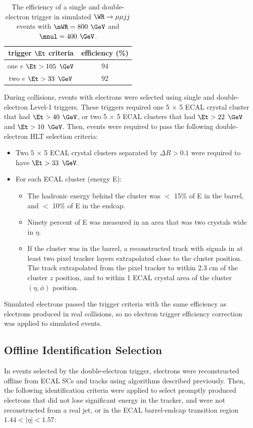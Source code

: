 \begin{table}[h]
	\caption{The efficiency of a single and double-electron trigger in simulated $\WR \rightarrow \mu\mu jj$ events with $\mWR = 800$ $\GeV$ 
		and $\mnul = 400$ $\GeV$.}
	\label{tab:singleVsDblEleHlt}
	\centering
	\begin{tabular}{c|c}
		trigger $\Et$ criteria & efficiency (\%) \\  \hline
		one $e$ $\Et >105$ $\GeV$ & 94  \\ 
		two $e$ $\Et >33$ $\GeV$ & 92  \\
	\end{tabular}
\end{table}

During collisions, events with electrons were selected using single and double-electron Level-1 triggers.  These triggers required 
one 5 $\times$ 5 ECAL crystal cluster that had $\Et > 40$ $\GeV$, or two 5 $\times$ 5 ECAL clusters that had 
$\Et > 22$ $\GeV$ and $\Et > 10$ $\GeV$.  Then, events were required to pass the following double-electron HLT selection criteria:

\begin{itemize}
	\item Two 5 $\times$ 5 ECAL crystal clusters separated by $\Delta R > 0.1$ were required to have $\Et > 33$ $\GeV$.
	\item For each ECAL cluster (energy E):
	\begin{itemize}
		\item The hadronic energy behind the cluster was $<$ 15\% of E in the barrel, and $<$ 10\% of E in the endcap. 
		\item Ninety percent of E was measured in an area that was two crystals wide in $\eta$.
		\item If the cluster was in the barrel, a reconstructed track with signals in at least two pixel tracker layers 
			extrapolated close to the cluster position.  The track extrapolated from the pixel tracker to within $2.3$ cm 
			of the cluster $z$ position, and to within 1 ECAL crystal area of the cluster $(\eta,\phi)$ position.
	\end{itemize}
\end{itemize}

Simulated electrons passed the trigger criteria with the same efficiency as electrons produced in real collisions, so no electron 
trigger efficiency correction was applied to simulated events.

\subsection{Offline Identification Selection}
In events selected by the double-electron trigger, electrons were reconstructed offline from ECAL SCs and tracks using algorithms 
described previously.  Then, the following identification criteria were applied to select promptly produced 
electrons that did not lose significant energy in the tracker, and were not reconstructed from a real jet, or in the ECAL barrel-endcap 
transition region $1.44 < |\eta| < 1.57$:

